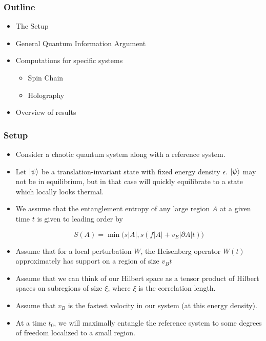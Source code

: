 \documentclass[10pt,aspectratio=169]{beamer}
\begin{document}
\begin{frame}
\frametitle{Outline}

\begin{itemize}

\item The Setup

\item General Quantum Information Argument

\item Computations for specific systems

	\begin{itemize}
	
	\item Spin Chain 
	
	\item Holography	
	
	\end{itemize}
	
\item Overview of results

\end{itemize}

\end{frame}

\begin{frame}
\frametitle{Setup}

\begin{itemize}

\item Consider a chaotic quantum system along with a reference system.

\item Let $\ket{\psi}$ be a translation-invariant state with fixed energy density $\epsilon$. $\ket{\psi}$ may not be in equilibrium, but in that case will quickly equilibrate to a state which locally looks thermal. 

\item We assume that the entanglement entropy of any large region $A$ at a given time $t$ is given to leading order by

\begin{equation}
S(A) = \min \bigg(s |A|, s \left(f |A| + v_E |\partial A| t \right) \bigg)
\end{equation}

\item Assume that for a local perturbation $W$, the Heisenberg operator $W(t)$ approximately has support on a region of size $v_B t$

\item Assume that we can think of our Hilbert space as a tensor product of Hilbert spaces on subregions of size $\xi$, where $\xi$ is the correlation length.

\item Assume that $v_B$ is the fastest velocity in our system (at this energy density).

\item At a time $t_0$, we will maximally entangle the reference system to some degrees of freedom localized to a small region.

\end{itemize}

\end{frame}
\end{document}
